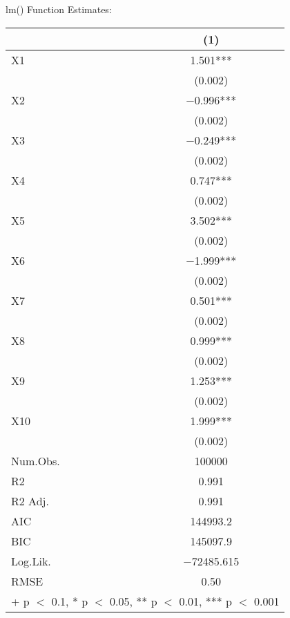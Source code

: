 \documentclass{article}
\begin{document}
\begin{table}
\centering
lm() Function Estimates: \\
\begin{tabular}[t]{lc}
\toprule
  & (1)\\
\midrule
X1 & \num{1.501}***\\
 & \vphantom{9} (\num{0.002})\\
X2 & \num{-0.996}***\\
 & \vphantom{8} (\num{0.002})\\
X3 & \num{-0.249}***\\
 & \vphantom{7} (\num{0.002})\\
X4 & \num{0.747}***\\
 & \vphantom{6} (\num{0.002})\\
X5 & \num{3.502}***\\
 & \vphantom{5} (\num{0.002})\\
X6 & \num{-1.999}***\\
 & \vphantom{4} (\num{0.002})\\
X7 & \num{0.501}***\\
 & \vphantom{3} (\num{0.002})\\
X8 & \num{0.999}***\\
 & \vphantom{2} (\num{0.002})\\
X9 & \num{1.253}***\\
 & \vphantom{1} (\num{0.002})\\
X10 & \num{1.999}***\\
 & (\num{0.002})\\
\midrule
Num.Obs. & \num{100000}\\
R2 & \num{0.991}\\
R2 Adj. & \num{0.991}\\
AIC & \num{144993.2}\\
BIC & \num{145097.9}\\
Log.Lik. & \num{-72485.615}\\
RMSE & \num{0.50}\\
\bottomrule
\multicolumn{2}{l}{\rule{0pt}{1em}+ p $<$ 0.1, * p $<$ 0.05, ** p $<$ 0.01, *** p $<$ 0.001}\\
\end{tabular}
\end{table}
\end{document}
